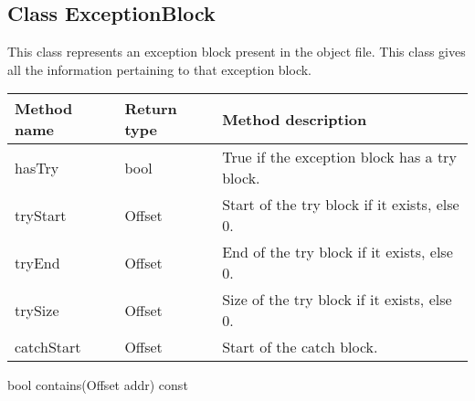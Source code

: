 \subsection{Class ExceptionBlock}\label{ExceptionBlock}
This class represents an exception block present in the object file. This class gives all the information pertaining to that exception block.

\begin{tabular}{p{1.25in}p{1in}p{3.25in}}
	Method name & Return type & Method description \\
	\hline
	hasTry & bool & True if the exception block has a try block. \\
	tryStart & Offset & Start of the try block if it exists, else 0. \\
	tryEnd & Offset & End of the try block if it exists, else 0. \\
	trySize & Offset & Size of the try block if it exists, else 0. \\
	catchStart & Offset & Start of the catch block. \\
\end{tabular} 


\begin{apient}
bool contains(Offset addr) const
\end{apient}
